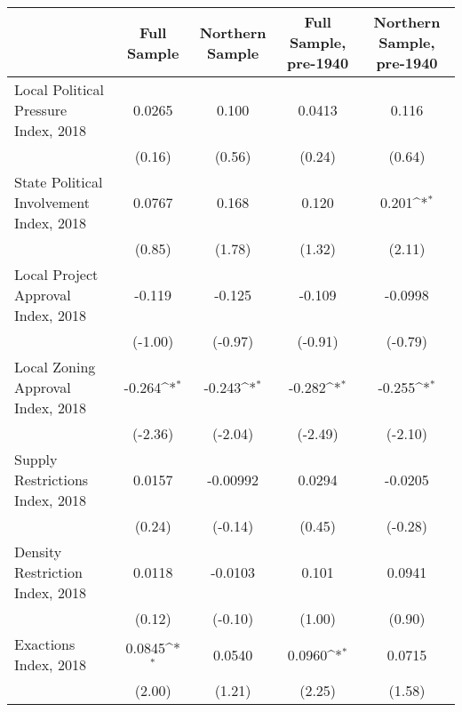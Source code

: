 \begin{table}[htbp]\centering
\def\sym#1{\ifmmode^{#1}\else\(^{#1}\)\fi}
\caption{ \label{tab1}}
\begin{tabular}{l*{4}{c}}
\toprule
                    &\multicolumn{1}{c}{Full Sample}&\multicolumn{1}{c}{Northern Sample}&\multicolumn{1}{c}{Full Sample, pre-1940}&\multicolumn{1}{c}{Northern Sample, pre-1940}\\
\midrule
Local Political Pressure Index, 2018&      0.0265         &       0.100         &      0.0413         &       0.116         \\
                    &      (0.16)         &      (0.56)         &      (0.24)         &      (0.64)         \\
\addlinespace
State Political Involvement Index, 2018&      0.0767         &       0.168         &       0.120         &       0.201\sym{*}  \\
                    &      (0.85)         &      (1.78)         &      (1.32)         &      (2.11)         \\
\addlinespace
Local Project Approval Index, 2018&      -0.119         &      -0.125         &      -0.109         &     -0.0998         \\
                    &     (-1.00)         &     (-0.97)         &     (-0.91)         &     (-0.79)         \\
\addlinespace
Local Zoning Approval Index, 2018&      -0.264\sym{*}  &      -0.243\sym{*}  &      -0.282\sym{*}  &      -0.255\sym{*}  \\
                    &     (-2.36)         &     (-2.04)         &     (-2.49)         &     (-2.10)         \\
\addlinespace
Supply Restrictions Index, 2018&      0.0157         &    -0.00992         &      0.0294         &     -0.0205         \\
                    &      (0.24)         &     (-0.14)         &      (0.45)         &     (-0.28)         \\
\addlinespace
Density Restriction Index, 2018&      0.0118         &     -0.0103         &       0.101         &      0.0941         \\
                    &      (0.12)         &     (-0.10)         &      (1.00)         &      (0.90)         \\
\addlinespace
Exactions Index, 2018&      0.0845\sym{*}  &      0.0540         &      0.0960\sym{*}  &      0.0715         \\
                    &      (2.00)         &      (1.21)         &      (2.25)         &      (1.58)         \\

\end{tabular}
\end{table}

